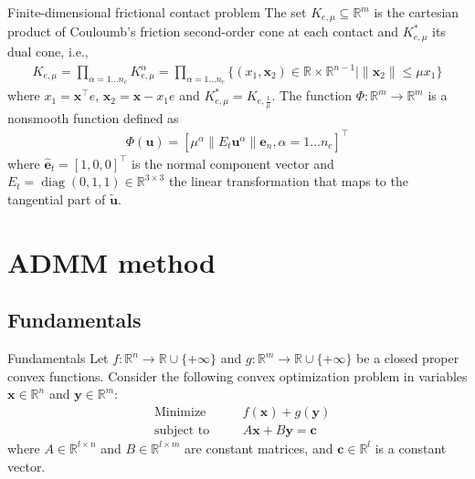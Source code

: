 \documentclass[8pt,red]{beamer}
\theoremstyle{plain}
\theoremstyle{definition}
\theoremstyle{remark}
\newcommand{\MIN}{\mathop{\mathrm{Minimize}}}
\newcommand{\ST}{\mathop{\mathrm{subject~to}}}
\newcommand{\diag}{\mathop{\mathrm{diag}}\nolimits}
\newcommand{\overRe}{\ensuremath{\Re\cup\{+\infty\}}}
\renewcommand{\Re}{\ensuremath{\mathbb{R}}}
\newcommand{\bi}[1]{\ensuremath{\boldsymbol{#1}}}
\begin{document}
\begin{frame}{Finite-dimensional frictional contact problem}
The set $K_{e,\mu} \subseteq \Re^{m}$ is the cartesian product of Couloumb's friction second-order cone at each contact and $K_{e,\mu}^{*}$ its dual cone, i.e.,
\begin{align}
	K_{e,\mu} = \prod_{\alpha = 1...n_{c}} K_{e,\mu}^{\alpha} =
	\prod_{\alpha = 1...n_{c}} \{ (x_{1},\bi{x}_{2}) \in \Re \times \Re^{n-1} \mid \| \bi{x}_{2} \| \le \mu x_{1} \}
\end{align}
where $x_{1} = \bi{x}^{\top} e$, $\bi{x}_{2} = \bi{x} - x_{1} e$ and $K_{e,\mu}^{*} =  K_{e,\frac{1}{\mu}}$. The function $\Phi: \Re^{m} \rightarrow \Re^{m}$ is a nonsmooth function defined as
\begin{align}
	\Phi(\bi{u}) = [\mu^{\alpha} \| E_{t} \bi{u}^{\alpha} \| \hat{\bi{e}}_{n}, \alpha = 1...n_{c}]^{\top}
\end{align}
where $\hat{\bi{e}}_{t} = [1, 0, 0]^{\top}$ is the normal component vector and $E_{t} = \diag (0,1,1) \in \Re^{3 \times 3}$ the linear transformation that maps to the tangential part of $\tilde{\bi{u}}$.
\end{frame}

\section{ADMM method}

\subsection{Fundamentals}

\begin{frame}{Fundamentals}
Let $f : \Re^{n} \to \overRe$ and 
$g : \Re^{m} \to \overRe$ be a closed proper convex 
functions. 
Consider the following convex optimization problem in variables 
$\bi{x} \in \Re^{n}$ and $\bi{y} \in \Re^{m}$: 
\begin{subequations}\label{P.convex.1}%
  \begin{alignat}{3}
    & \MIN  &{\quad}& 
    f(\bi{x}) + g(\bi{y}) \\
    & \ST && 
    A \bi{x} + B \bi{y} = \bi{c}  
  \end{alignat}
\end{subequations}
where $A \in \Re^{l \times n}$ and $B \in \Re^{l \times m}$ are constant 
matrices, and $\bi{c} \in \Re^{l}$ is a constant vector.
\end{frame}
\end{document}
